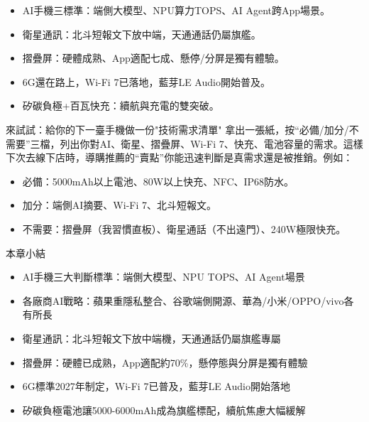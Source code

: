 \begin{itemize}
  \item AI手機三標準：端側大模型、NPU算力TOPS、AI Agent跨App場景。
  \item 衛星通訊：北斗短報文下放中端，天通通話仍屬旗艦。
  \item 摺疊屏：硬體成熟、App適配七成、懸停/分屏是獨有體驗。
  \item 6G還在路上，Wi-Fi 7已落地，藍芽LE Audio開始普及。
  \item 矽碳負極+百瓦快充：續航與充電的雙突破。
\end{itemize}

\begin{tcbpractice}{來試試：給你的下一臺手機做一份"技術需求清單"}
拿出一張紙，按“必備/加分/不需要”三檔，列出你對AI、衛星、摺疊屏、Wi-Fi 7、快充、電池容量的需求。這樣下次去線下店時，導購推薦的“賣點”你能迅速判斷是真需求還是被推銷。例如：

\begin{itemize}
  \item 必備：5000mAh以上電池、80W以上快充、NFC、IP68防水。
  \item 加分：端側AI摘要、Wi-Fi 7、北斗短報文。
  \item 不需要：摺疊屏（我習慣直板）、衛星通話（不出遠門）、240W極限快充。
\end{itemize}

\end{tcbpractice}

\begin{tcbsummary}{本章小結}
\begin{itemize}
  \item AI手機三大判斷標準：端側大模型、NPU TOPS、AI Agent場景
  \item 各廠商AI戰略：蘋果重隱私整合、谷歌端側開源、華為/小米/OPPO/vivo各有所長
  \item 衛星通訊：北斗短報文下放中端機，天通通話仍屬旗艦專屬
  \item 摺疊屏：硬體已成熟，App適配約70\%，懸停態與分屏是獨有體驗
  \item 6G標準2027年制定，Wi-Fi 7已普及，藍芽LE Audio開始落地
  \item 矽碳負極電池讓5000-6000mAh成為旗艦標配，續航焦慮大幅緩解
\end{itemize}

\end{tcbsummary}
